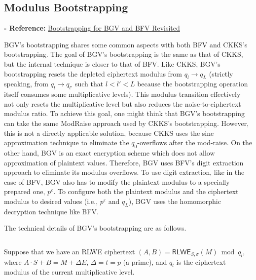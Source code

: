 \subsection{Modulus Bootstrapping}
\label{subsec:bgv-bootstrapping}

\noindent \textbf{- Reference:} 
\href{https://eprint.iacr.org/2022/1363.pdf}{Bootstrapping for BGV and BFV Revisited}~\cite{cryptoeprint:2022/1363}

BGV's bootstrapping shares some common aspects with both BFV and CKKS's bootstrapping. The goal of BGV's bootstrapping is the same as that of CKKS, but the internal technique is closer to that of BFV. Like CKKS, BGV's bootstrapping resets the depleted ciphertext modulus from $q_l \rightarrow q_L$ (strictly speaking, from $q_l \rightarrow q_{l'}$ such that $l < l' < L$ because the bootstrapping operation itself consumes some multiplicative levels). This modulus transition effectively not only resets the multiplicative level but also reduces the noise-to-ciphertext modulus ratio. To achieve this goal, one might think that BGV's bootstrapping can take the same \textsf{ModRaise} approach used by CKKS's bootstrapping. However, this is not a directly applicable solution, because CKKS uses the sine approximation technique to eliminate the $q_0$-overflows after the mod-raise. On the other hand, BGV is an exact encryption scheme which does not allow approximation of plaintext values. Therefore, BGV uses BFV's digit extraction approach to eliminate its modulus overflows. To use digit extraction, like in the case of BFV, BGV also has to modify the plaintext modulus to a specially prepared one, $p^\varepsilon$. To configure both the plaintext modulus and the ciphertext modulus to desired values (i.e., $p^\varepsilon$ and $q_L$), BGV uses the homomorphic decryption technique like BFV.  


The technical details of BGV's bootstrapping are as follows. 

$ $

Suppose that we have an RLWE ciphertext $(A, B)  = \textsf{RLWE}_{S, \sigma}(M) \bmod q_l$, where $A\cdot S + B = M + \Delta E$, \text{ } $\Delta = t = p$ (a prime), and $q_l$ is the ciphertext modulus of the current multiplicative level. 

$ $

